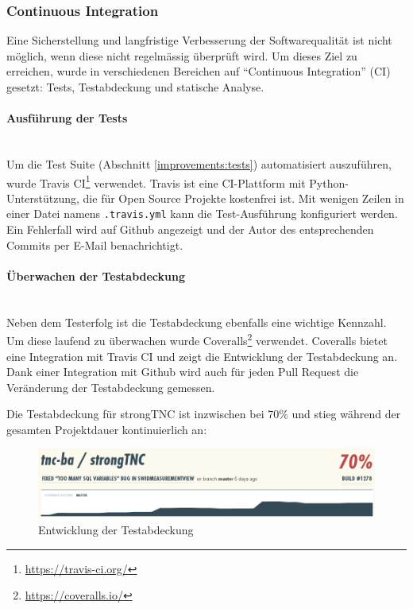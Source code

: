 \subsubsection{Continuous Integration}
\label{improvements:ci}

Eine Sicherstellung und langfristige Verbesserung der Softwarequalität ist nicht
möglich, wenn diese nicht regelmässig überprüft wird. Um dieses Ziel zu
erreichen, wurde in verschiedenen Bereichen auf \enquote{Continuous
Integration} (CI) gesetzt: Tests, Testabdeckung und statische Analyse.

\paragraph{Ausführung der Tests} \hspace{0pt} \\
\label{improvements:travis}
Um die Test Suite (Abschnitt \ref{improvements:tests}) automatisiert
auszuführen, wurde Travis CI\footnote{\url{https://travis-ci.org/}}
verwendet. Travis ist eine CI-Plattform mit Python-Unterstützung, die für Open
Source Projekte kostenfrei ist. Mit wenigen Zeilen in einer
Datei namens \texttt{.travis.yml} kann die Test-Ausführung konfiguriert werden.
Ein Fehlerfall wird auf Github angezeigt und der Autor des
entsprechenden Commits per E-Mail benachrichtigt.

\paragraph{Überwachen der Testabdeckung} \hspace{0pt} \\
Neben dem Testerfolg ist die Testabdeckung ebenfalls eine wichtige Kennzahl. Um
diese laufend zu überwachen wurde
Coveralls\footnote{\url{https://coveralls.io/}} verwendet. Coveralls bietet eine
Integration mit Travis CI und zeigt die Entwicklung der Testabdeckung an. Dank
einer Integration mit Github wird auch für jeden Pull Request die Veränderung
der Testabdeckung gemessen.

Die Testabdeckung für strongTNC ist inzwischen bei 70\% und stieg während der
gesamten Projektdauer kontinuierlich an:

\begin{figure}[H]
	\centering
	\includegraphics[width=\textwidth]{images/coveralls}
	\caption{Entwicklung der Testabdeckung}
	\label{improvements:coveralls}
\end{figure}

